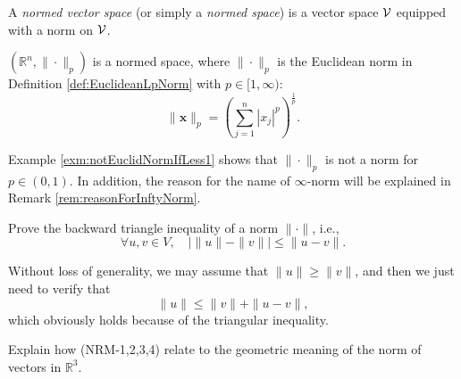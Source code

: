 \begin{defn}
  \label{def:normedSpace}
  A \emph{normed vector space} (or simply a \emph{normed space})
  is a vector space ${\cal V}$
  equipped with a norm on ${\cal V}$.
\end{defn}

\begin{exm}
  \label{exm:RdEuclideanSpace}
  $\left(\mathbb{R}^n, \|\cdot\|_p\right)$
  is a normed space, 
  where $\|\cdot\|_p$ is the Euclidean norm
  in Definition \ref{def:EuclideanLpNorm}
  with $p\in[1,\infty)$: 
  \begin{displaymath}
    \|\mathbf{x}\|_p= \left(\sum_{j=1}^n |x_j|^p\right)^{\frac{1}{p}}.
  \end{displaymath}
\end{exm}

\begin{rem}
  Example \ref{exm:notEuclidNormIfLess1}
  shows that $\|\cdot\|_p$ is not a norm for $p\in(0,1)$.
  In addition, the reason for the name of $\infty$-norm
  will be explained in Remark \ref{rem:reasonForInftyNorm}.
\end{rem}

\begin{exc}
  Prove the backward triangle inequality of a norm $\|\cdot\|$, i.e., 
  \begin{equation}
    \label{eq:backwardTriangle}
    \forall u,v \in V,\quad
    \left|\|u\|-\|v\|\right| \le \|u-v\|.
  \end{equation}
\end{exc}
\begin{solution}
  Without loss of generality, we may assume that $\|u\|\geq\|v\|$, and then we just need to verify that
  \begin{equation*}
    \|u\|\leq\|v\|+\|u-v\|,
  \end{equation*}
  which obviously holds because of the triangular inequality.
\end{solution}

\begin{exc}
  Explain how (NRM-1,2,3,4) relate to the geometric meaning
  of the norm of vectors in $\mathbb{R}^3$.
\end{exc}

